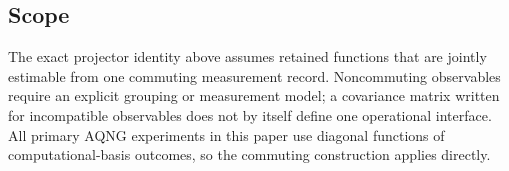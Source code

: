 \subsection{Scope}
The exact projector identity above assumes retained functions that are jointly estimable from one commuting measurement record. Noncommuting observables require an explicit grouping or measurement model; a covariance matrix written for incompatible observables does not by itself define one operational interface. All primary AQNG experiments in this paper use diagonal functions of computational-basis outcomes, so the commuting construction applies directly.
